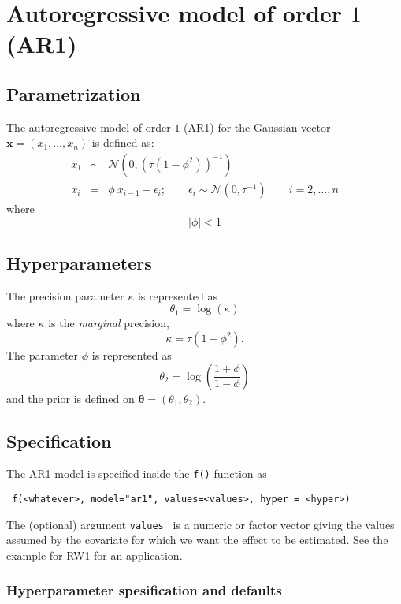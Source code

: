 \documentclass[a4paper,11pt]{article}
\begin{document}
\section*{Autoregressive model of order $1$ (AR1)}

\subsection*{Parametrization}

The autoregressive model of order $1$ (AR1) for the Gaussian vector
$\mathbf{x}=(x_1,\dots,x_n)$ is defined as:
\begin{eqnarray}\nonumber
    x_1&\sim&\mathcal{N}(0,(\tau(1-\phi^2))^{-1}) \\\nonumber
    x_i&=&\phi\ x_{i-1}+\epsilon_i; \qquad \epsilon_i\sim\mathcal{N}(0,\tau^{-1}) \qquad  i=2,\dots,n
\end{eqnarray}
where
\[
|\phi|<1
\]

\subsection*{Hyperparameters}

The precision parameter $\kappa$ is represented as
\begin{displaymath}
    \theta_1 =\log(\kappa) 
\end{displaymath}
where $\kappa$ is the \emph{marginal} precision,
\begin{displaymath}
    \kappa = \tau (1-\phi^{2}).
\end{displaymath}
The parameter $\phi$ is represented as
\[
\theta_2 = \log\left(\frac{1+\phi}{1-\phi}\right)
\]
and the prior is defined on $\mathbf{\theta}=(\theta_1,\theta_2)$. 

\subsection*{Specification}

The AR1 model is specified inside the {\tt f()} function as
\begin{verbatim}
 f(<whatever>, model="ar1", values=<values>, hyper = <hyper>)
\end{verbatim}
The (optional) argument {\tt values } is a numeric or factor vector
giving the values assumed by the covariate for which we want the
effect to be estimated. See the example for RW1 for an application.

\subsubsection*{Hyperparameter spesification and defaults}

\end{document}
